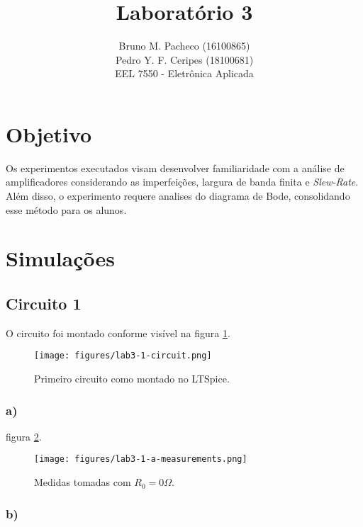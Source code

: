 \documentclass[a4paper]{report}
\begin{document}
 
\title{Laboratório 3}
\author{Bruno M. Pacheco (16100865)\\
Pedro Y. F. Ceripes (18100681) \\
EEL 7550 - Eletrônica Aplicada}
 
\maketitle

\section*{Objetivo}
 
Os experimentos executados visam desenvolver familiaridade com a análise de amplificadores considerando as imperfeições, largura de banda finita e \textit{Slew-Rate}. Além disso, o experimento requere analises do diagrama de Bode, consolidando esse método para os alunos.
 
\section*{Simulações}

\subsection*{Circuito 1}

O circuito foi montado conforme visível na figura \ref{fig:figures-lab3-1-circuit-png}.

\begin{figure}[H]
    \centering
    \texttt{[image: figures/lab3-1-circuit.png]}
    \caption{Primeiro circuito como montado no LTSpice.}
    \label{fig:figures-lab3-1-circuit-png}
\end{figure}

\subsubsection*{a)}

figura \ref{fig:figures-lab3-1-a-measurements-png}.

\begin{figure}[H]
    \centering
    \texttt{[image: figures/lab3-1-a-measurements.png]}
    \caption{Medidas tomadas com $R_0=0 \Omega$.}
    \label{fig:figures-lab3-1-a-measurements-png}
\end{figure}

\subsubsection*{b)}
\end{document}
